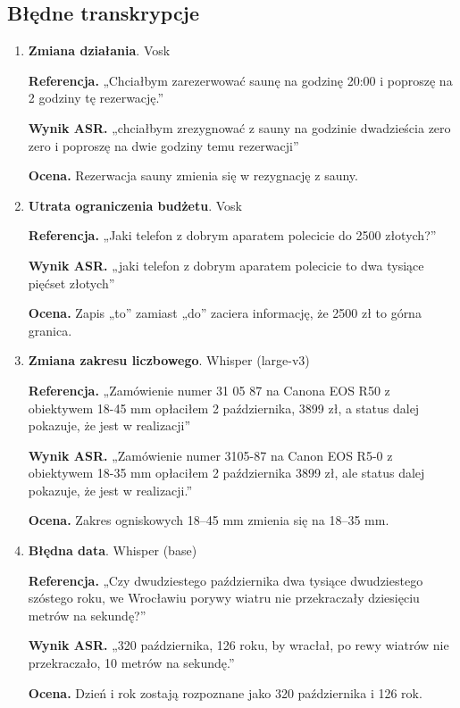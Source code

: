 \documentclass{article}
\begin{document}
\subsection{Błędne transkrypcje}

\begin{enumerate}
    \item \textbf{Zmiana działania}. Vosk
    \par\textbf{Referencja.} „Chciałbym zarezerwować saunę na godzinę 20:00 i poproszę na 2 godziny tę rezerwację.”
    \par\textbf{Wynik ASR.} „chciałbym zrezygnować z sauny na godzinie dwadzieścia zero zero i poproszę na dwie godziny temu rezerwacji”
    \par\textbf{Ocena.} Rezerwacja sauny zmienia się w rezygnację z sauny.

    \item \textbf{Utrata ograniczenia budżetu}. Vosk
    \par\textbf{Referencja.} „Jaki telefon z dobrym aparatem polecicie do 2500 złotych?”
    \par\textbf{Wynik ASR.} „jaki telefon z dobrym aparatem polecicie to dwa tysiące pięćset złotych”
    \par\textbf{Ocena.} Zapis „to” zamiast „do” zaciera informację, że 2500 zł to górna granica.

    \item \textbf{Zmiana zakresu liczbowego}. Whisper (large-v3)
    \par\textbf{Referencja.} „Zamówienie numer 31 05 87 na Canona EOS R50 z obiektywem 18-45 mm opłaciłem 2 października, 3899 zł, a status dalej pokazuje, że jest w realizacji”
    \par\textbf{Wynik ASR.} „Zamówienie numer 3105-87 na Canon EOS R5-0 z obiektywem 18-35 mm opłaciłem 2 października 3899 zł, ale status dalej pokazuje, że jest w realizacji.”
    \par\textbf{Ocena.} Zakres ogniskowych 18--45 mm zmienia się na 18--35 mm.

    \item \textbf{Błędna data}. Whisper (base)
    \par\textbf{Referencja.} „Czy dwudziestego października dwa tysiące dwudziestego szóstego roku, we Wrocławiu porywy wiatru nie przekraczały dziesięciu metrów na sekundę?”
    \par\textbf{Wynik ASR.} „320 października, 126 roku, by wracłał, po rewy wiatrów nie przekraczało, 10 metrów na sekundę.”
    \par\textbf{Ocena.} Dzień i rok zostają rozpoznane jako 320 października i 126 rok.


\end{enumerate}
\end{document}
